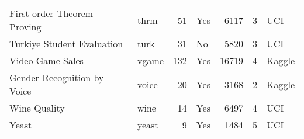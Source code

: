 \begin{tabular}{llrlrrl}
                       First-order Theorem Proving &    thrm &   51 &             Yes &   6117 &  3 &    UCI \\
                        Turkiye Student Evaluation &    turk &   31 &              No &   5820 &  3 &    UCI \\
                                  Video Game Sales &   vgame &  132 &             Yes &  16719 &  4 & Kaggle \\
                       Gender Recognition by Voice &   voice &   20 &             Yes &   3168 &  2 & Kaggle \\
                                      Wine Quality &    wine &   14 &             Yes &   6497 &  4 &    UCI \\
                                             Yeast &   yeast &    9 &             Yes &   1484 &  5 &    UCI \\
\bottomrule
\end{tabular}

